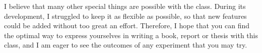 
I believe that many other special things are possible with the
 class. During its development, I struggled to keep it as
flexible as possible, so that new features could be added without too
great an effort. Therefore, I hope that you can find the optimal way to
express yourselves in writing a book, report or thesis with this class,
and I am eager to see the outcomes of any experiment that you may try.

